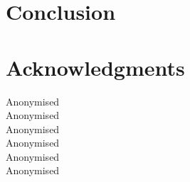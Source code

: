\documentclass[11pt]{article}
\begin{document}




\section{Conclusion}



\section*{Acknowledgments}

Anonymised\\
Anonymised\\
Anonymised\\
Anonymised\\
Anonymised\\
Anonymised\\




\end{document}

